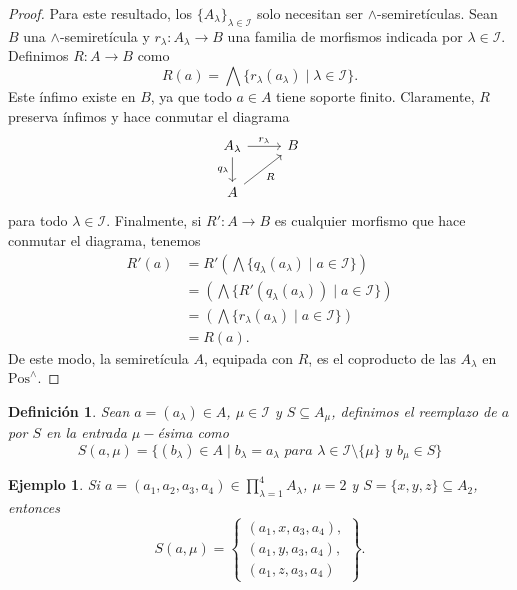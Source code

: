 \documentclass[12pt,letterpaper,titlepage]{article}
\newtheorem*{defn}{Definición}
\newtheorem*{exa}{Ejemplo}
\theoremstyle{definition}
\renewcommand\inf{\wedge}
\newcommand\Inf{\bigwedge}
\newcommand\scr[1]{\mathscr{#1}}
\newcommand\<{\langle}
\renewcommand\>{\rangle}
\newcommand{\Pos}{\mathrm{Pos}}
\begin{document}
\begin{proof}
    Para este resultado, los $\{A_\lambda\}_{\lambda\in\scr I}$
    solo necesitan ser $\inf$-semiretículas.
    Sean $B$ una $\inf$-semiretícula y
    $r_\lambda:A_\lambda\to B$ una familia de morfismos
    indicada por $\lambda\in\scr I$.
    Definimos $R:A\to B$ como
    \[
        R(a) = \Inf\{r_\lambda(a_\lambda) \mid \lambda \in \scr I\}
    .\]
    Este ínfimo existe en $B$, ya que todo $a\in A$ tiene soporte
    finito.
    Claramente, $R$ preserva ínfimos y hace conmutar el diagrama
    \[
        \begin{tikzcd}
            A_\lambda \ar[r,"r_\lambda"] \ar[d,"q_\lambda"']
            & B \\
            A \ar[ur,"R"']
        \end{tikzcd}
    \]
    para todo $\lambda\in \scr I$.
    Finalmente, si $R':A\to B$ es cualquier morfismo
    que hace conmutar el diagrama, tenemos
    \begin{align*}
        R'(a)
        &= R'(\Inf\{q_\lambda(a_\lambda)\mid a\in \scr I\}) \\
        &= (\Inf\{R'(q_\lambda(a_\lambda))\mid a\in \scr I\}) \\
        &= (\Inf\{r_\lambda(a_\lambda)\mid a\in \scr I\}) \\
        &= R(a).
    \end{align*}
    De este modo, la semiretícula $A$, equipada con $R$,
    es el coproducto de las $A_\lambda$ en $\Pos^\inf$.
\end{proof}

\begin{defn}
Sean $a=(a_\lambda)\in A$, $\mu\in\scr I$ y $S\subseteq A_\mu$, definimos el reemplazo de $a$ por $S$ en la entrada $\mu-$ésima como
\[S(a,\mu)=\{(b_\lambda)\in A\mid b_\lambda=a_\lambda\textit{ para }\lambda\in\scr I\setminus \{\mu\}\textit{ y }b_\mu\in S\}\]
\end{defn}
\begin{exa}
Si $a=(a_1,a_2,a_3,a_4)\in\prod_{\lambda=1}^4A_\lambda$, $\mu=2$ y $S=\{x,y,z\}\subseteq A_2$, entonces
    \[
      S(a,\mu) = \left\{
      \begin{array}{c}
        (a_1,x,a_3,a_4), \\
        (a_1,y,a_3,a_4), \\
        (a_1,z,a_3,a_4)
      \end{array}
      \right\}
    .\]
\end{exa}
\end{document}
